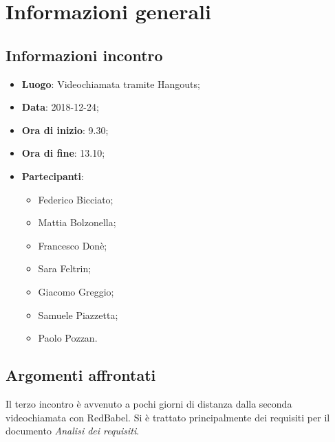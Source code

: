 \section{Informazioni generali}

\subsection{Informazioni incontro}
\begin{itemize}
\item \textbf{Luogo}: Videochiamata tramite Hangouts;
\item \textbf{Data}: 2018-12-24;
\item \textbf{Ora di inizio}: 9.30;
\item \textbf{Ora di fine}: 13.10;
\item \textbf{Partecipanti}:
\begin{itemize}
	\item Federico Bicciato;
	\item Mattia Bolzonella;
	\item Francesco Donè;
	\item Sara Feltrin;
	\item Giacomo Greggio;
	\item Samuele Piazzetta;
	\item Paolo Pozzan.
\end{itemize}
\end{itemize}

\subsection{Argomenti affrontati}
Il terzo incontro è avvenuto a pochi giorni di distanza dalla seconda videochiamata con RedBabel. Si è trattato principalmente dei requisiti per il documento \textit{Analisi dei requisiti}.
